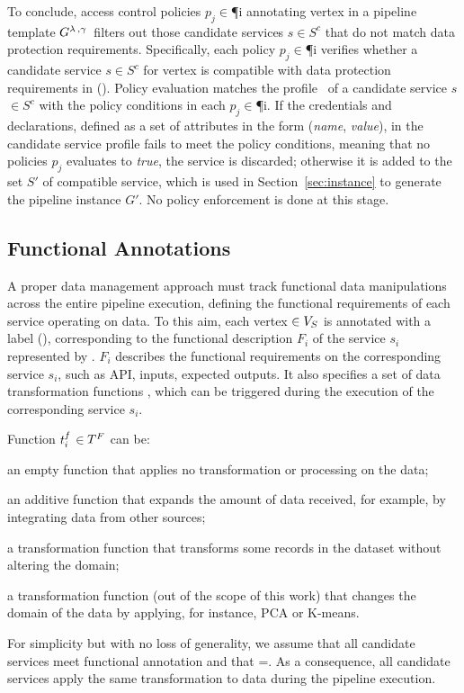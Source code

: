       To conclude, access control policies $p_j$$\in$\P{i} annotating vertex  in a pipeline template $G^{\lambda\,,\gamma\,}$ filters out those candidate services $s$$\in$$S^c$ that do not match data protection requirements. Specifically, each policy $p_j$$\in$\P{i} verifies whether a candidate service $s$$\in$$S^c$ for vertex  is compatible with data protection requirements in \myLambda(). Policy evaluation matches the profile \profile\ of a candidate service $s$$\in$$S^c$ with the policy conditions in each $p_j$$\in$\P{i}. If the credentials and declarations, defined as a set of attributes in the form (\emph{name}, \emph{value}), in the candidate service profile fails to meet the policy conditions, meaning that no policies $p_j$ evaluates to \emph{true}, the service is discarded; otherwise it is added to the set $S'$ of compatible service, which is used in Section~\ref{sec:instance} to generate the pipeline instance $G'$. No policy enforcement is done at this stage.

    \subsection{Functional Annotations}\label{sec:funcannotation}
    A proper data management approach must track functional data manipulations across the entire pipeline execution, defining the functional requirements of each service operating on data.
    To this aim, each vertex $\in V_S$ is annotated with a label \myGamma(), corresponding to the functional description $F_i$ of the service $s_i$ represented by .
    $F_i$ describes the functional requirements on the corresponding service $s_i$, such as API, inputs, expected outputs.
    It also specifies a set \TF{} of data transformation functions , which can be triggered during the execution of the corresponding service $s_i$.

    Function $t^f_{i}$$\in$$T^F_{}$ can be:
    \begin{enumerate*}[label=\textit{\roman*})]
      \item an empty function \tf{\epsilon} that applies no transformation or processing on the data;
      \item an additive function  that expands the amount of data received, for example, by integrating data from other sources;
      \item a transformation function  that transforms some records in the dataset without altering the domain;
      \item a transformation function  (out of the scope of this work) that changes the domain of the data by applying, for instance, PCA or K-means.
    \end{enumerate*}

For simplicity but with no loss of generality, we assume that all candidate services meet functional annotation \F{} and that \TF{}=\tf{}. As a consequence, all candidate services apply the same transformation to data during the pipeline execution.

